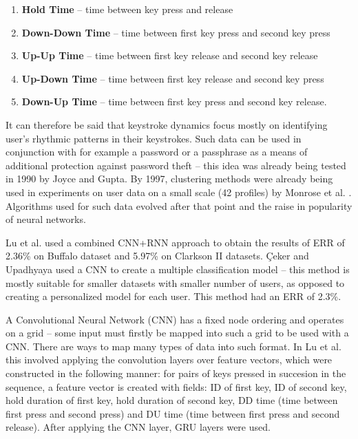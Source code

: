 \begin{enumerate}
    \item \textbf{Hold Time} -- time between key press and release
    \item \textbf{Down-Down Time} -- time between first key press and second key press
    \item \textbf{Up-Up Time} -- time between first key release and second key release
    \item \textbf{Up-Down Time} -- time between first key release and second key press
    \item \textbf{Down-Up Time} -- time between first key press and second key release.
\end{enumerate}

It can therefore be said that keystroke dynamics focus mostly on identifying user's rhythmic patterns in their keystrokes. Such data can be used in conjunction with for example a password or a passphrase as a means of additional protection against password theft -- this idea was already being tested in 1990 by Joyce and Gupta\cite{joyce1990keystroke}. By 1997, clustering methods were already being used in experiments on user data on a small scale (42 profiles) by Monrose et al. \cite{Monr1997}. Algorithms used for such data evolved after that point and the raise in popularity of neural networks.

Lu et al. \cite{Lu2020} used a combined CNN+RNN approach to obtain the results of ERR of 2.36\% on Buffalo dataset and 5.97\% on Clarkson II datasets. Çeker and Upadhyaya \cite{ceker_cnn2017} used a CNN to create a multiple classification model -- this method is mostly suitable for smaller datasets with smaller number of users, as opposed to creating a personalized model for each user. This method had an ERR of 2.3\%. 

A Convolutional Neural Network (CNN) has a fixed node ordering and operates on a grid -- some input must firstly be mapped into such a grid to be used with a CNN. There are ways to map many types of data into such format. In Lu et al. this involved applying the convolution layers over feature vectors, which were constructed in the following manner: for pairs of keys pressed in succesion in the sequence, a feature vector is created with fields: ID of first key, ID of second key, hold duration of first key, hold duration of second key, DD time (time between first press and second press) and DU time (time between first press and second release). After applying the CNN layer, GRU layers were used.

